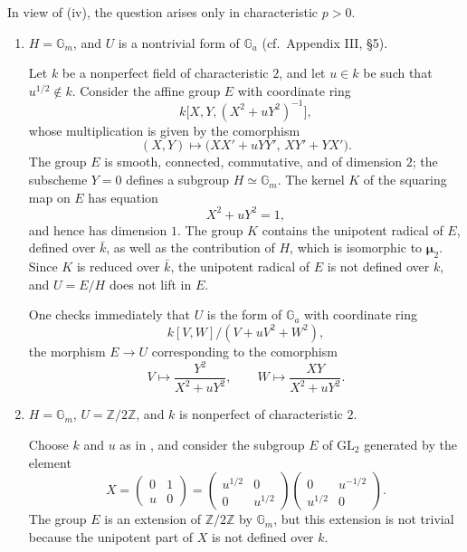 In view of (iv), the question arises only in
characteristic \(p>0\).

\begin{enumerate}
\item[(a)] 
  \(H=\mathbb G_m\), and \(U\) is a nontrivial form of
  \(\mathbb G_a\) (cf.\ Appendix III, \S5).

  Let \(k\) be a nonperfect field of characteristic \(2\), and
  let \(u\in k\) be such that \(u^{1/2}\notin k\).  Consider the
  affine group \(E\) with coordinate ring
  \[
    k\bigl[X,Y,(X^2+uY^2)^{-1}\bigr],
  \]
  whose multiplication is given by the comorphism
  \[
    (X,Y)\longmapsto
      \bigl(XX'+uYY',\,XY'+YX'\bigr).
  \]
  The group \(E\) is smooth, connected, commutative, and of
  dimension \(2\); the subscheme \(Y=0\) defines a subgroup
  \(H\simeq\mathbb G_m\).  The kernel \(K\) of the squaring map
  on \(E\) has equation
  \[
    X^2+uY^2=1,
  \]
  and hence has dimension \(1\).  The group \(K\) contains the
  unipotent radical of \(E\), defined over \(\bar k\), as well as
  the contribution of \(H\), which is isomorphic to
  \(\boldsymbol\mu_2\).  Since \(K\) is reduced over \(\bar k\),
  the unipotent radical of \(E\) is not defined over \(k\), and
  \(U=E/H\) does not lift in \(E\).

  One checks immediately that \(U\) is the form of
  \(\mathbb G_a\) with coordinate ring
  \[
    k[V,W]/(V+uV^2+W^2),
  \]
  the morphism \(E\longrightarrow U\) corresponding to the
  comorphism
  \[
    V\longmapsto\frac{Y^2}{X^2+uY^2},
    \qquad
    W\longmapsto\frac{XY}{X^2+uY^2}.
  \]

\item[(b)] 
  \(H=\mathbb G_m\), \(U=\mathbb Z/2\mathbb Z\), and \(k\) is
  nonperfect of characteristic \(2\).

  Choose \(k\) and \(u\) as in , and consider the subgroup
  \(E\) of \(\mathrm{GL}_2\) generated by the element
  \[
    X=
    \begin{pmatrix}0&1\\u&0\end{pmatrix}
    =
    \begin{pmatrix}u^{1/2}&0\\0&u^{1/2}\end{pmatrix}
    \begin{pmatrix}0&u^{-1/2}\\u^{1/2}&0\end{pmatrix}.
  \]
  The group \(E\) is an extension of \(\mathbb Z/2\mathbb Z\)
  by \(\mathbb G_m\), but this extension is not trivial because
  the unipotent part of \(X\) is not defined over \(k\).


\end{enumerate}
